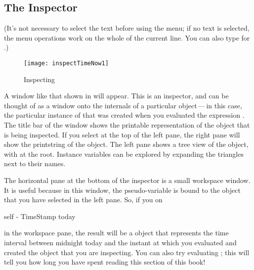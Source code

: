 \documentclass[a4paper,10pt,twoside]{book}
\begin{document}
\subsection{The Inspector}

(It's not necessary to select the text before using the menu; if no text is selected, the menu operations work on the whole of the current line.
You can also type  for .)

\begin{figure}[btp]
	\begin{center}
		\texttt{[image: inspectTimeNow1]}
	\end{center}
	\caption{Inspecting }
\end{figure}

A window like that shown in  will appear.   
This is an inspector, and can be thought of as a window onto the internals of a particular object\,---\,in this case, the particular instance of \mbox{} 
that was created when you evaluated the expression .
The title bar of the window shows the printable representation of the object that is being inspected.
If you select  at the top of the left pane, the right pane will show the printstring of the object.
The left pane shows a tree view of the object, with \self at the root.
Instance variables can be explored by expanding the triangles next to their names.

The horizontal pane at the bottom of the inspector is a small workspace window.  It is useful because in this window, the pseudo-variable  is bound to the object that you have selected in the left pane.
So, if you  on
\begin{code}{}
self - TimeStamp today
\end{code}
in the workspace pane, the result will be a  object that represents the time interval between midnight today and the instant at which you evaluated   and created the  object that you are inspecting.
You can also try evaluating ; this will tell you how long you have spent reading this section of this book!
\end{document}
